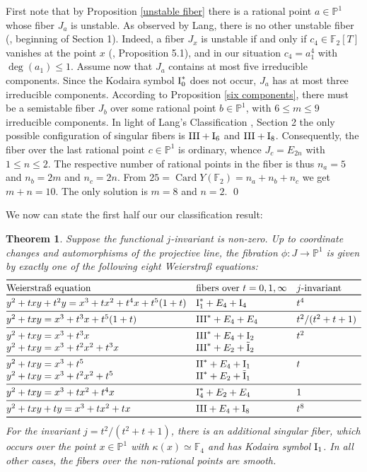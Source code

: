 \documentclass[oneside, 12pt]{amsart}
\newcommand\mylabel[1]{\label{#1}\marginpar{\vspace{-1ex}\medskip\medskip\footnotesize \tt #1}}
\renewcommand\mylabel[1]{\label{#1}}
\newtheorem{theorem}{Theorem}[section]
\theoremstyle{definition}
\theoremstyle{remark}
\newcommand{\FF}{\mathbb{F}}
\newcommand{\PP}{\mathbb{P}}
\newcommand{\Card}{\operatorname{Card}}
\newcommand{\I}{\text{\rm I}}
\newcommand{\II}{\text{\rm II}}
\newcommand{\III}{\text{\rm III}}
\newcommand{\tI}{\text{\rm \~{I}}}
\newcommand{\ra}{\rightarrow}
\begin{document}
\proof 
First note that by Proposition \ref{unstable fiber} there is a rational point $a\in\PP^1$ whose fiber $J_a$ is unstable.
As observed by Lang, there is no other unstable fiber (\cite{Lang 2000}, beginning of Section 1).
Indeed,  a fiber $J_x$ is unstable if and only if $c_4\in \FF_2[T]$ vanishes at the point $x$ (\cite{Deligne 1975}, Proposition 5.1), and 
in our situation  $c_4=a_1^4$ with $\deg(a_1)\leq 1$.
Assume now that $J_a$   contains at most five irreducible components. Since the Kodaira symbol $\I_0^*$ does not occur,
$J_a$ has at most three irreducible components.
According to Proposition \ref{six components}, there must be a semistable fiber $J_b$ over some rational point $b\in\PP^1$,
with $6\leq m\leq 9$ irreducible components.
In light of Lang's Classification \cite{Lang 2000}, Section 2 the only possible configuration of singular fibers
is $\III+\I_6$ and $\III+\I_8$. Consequently, the fiber over the last rational point $c\in\PP^1$ is ordinary,
whence $J_c=E_{2n}$ with $1\leq n\leq 2$.
The respective number of rational points in the fiber is thus 
$n_a=5$ and $n_b=2m$ and $n_c=2n$. From $25=\Card Y(\FF_2)=n_a+n_b+n_c$ we get $m+n=10$.
The only solution is  $m=8$ and $n=2$.
\qed

\medskip
We now can state the first half our our classification result:

\begin{theorem}
\mylabel{classification non-zero j}
Suppose the functional $j$-invariant is non-zero. 
Up to coordinate changes and automorphisms of the projective line,
the fibration $\phi:J\ra\PP^1$ is given by exactly one of the following eight Weierstra\ss{} equations: 
$$
\begin{array}[c]{@{}lll}
\toprule
\text{\rm Weierstra\ss{} equation}      & \text{\rm fibers over $t=0,1,\infty$}	& \text{\rm $j$-invariant}\\
\toprule
y^2+txy+t^2y=x^3+ tx^2+t^4x+t^5(1+t)    & \I_1^*+E_4+\I_4                       & t^4\\
\midrule
y^2+txy=x^3+t^3x+t^5(1+t)               & \III^*+E_4+E_4                        & t^2/(t^2+t+1)\\
\midrule
y^2+txy=x^3+t^3x 			            & \III^*+E_4+\I_2                       & t^2\\
y^2+txy=x^3+t^2x^2+t^3x                 & \III^*+E_2+\tI_2\\
\midrule
y^2+txy=x^3+t^5                         & \II^*+E_4+\I_1                        & t\\
y^2+txy=x^3+t^2x^2+t^5                  & \II^*+E_2+\tI_1\\
\midrule
y^2+txy=x^3+tx^2+t^4x                   & \I_4^* +E_2+E_4                       & 1\\
\midrule
y^2+txy+ty=x^3+tx^2+tx                     & \III+E_4+\I_8                         & t^8\\
\bottomrule
\end{array}
$$
For the invariant $j=t^2/(t^2+t+1)$, there is an additional singular fiber, which occurs over the point $x\in\PP^1$ with $\kappa(x)\simeq\FF_4$
and has Kodaira symbol $\I_1$.
In all other cases, the fibers over the non-rational points are smooth.
\end{theorem}
\end{document}
